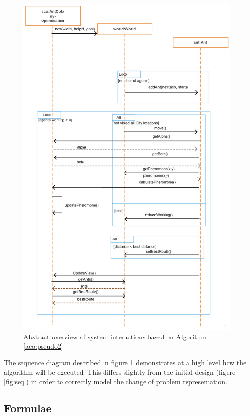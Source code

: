 \begin{figure}[H]
\includegraphics[scale=0.27]{Images/chapter4/sequence}
\caption{Abstract overview of system interactions based on Algorithm \ref{aco:pseudo2}}
\label{fig:overSeq}
\end{figure}

The sequence diagram described in figure \ref{fig:overSeq} demonstrates at a high level how the algorithm will be executed. This differs slightly from the initial design (figure \ref{fig:seq}) in order to correctly model the change of problem representation.

\subsection{Formulae}

